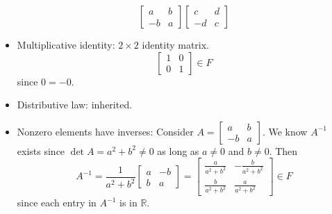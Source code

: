 \documentclass{amsart}
\begin{document}
\begin{itemize}
$$\begin{bmatrix}
		a & b \\
		-b & a
		\end{bmatrix} \begin{bmatrix}
		c & d \\
		-d & c
		\end{bmatrix}  $$
		\item Multiplicative identity: $2\times 2$ identity matrix.
		$$ \begin{bmatrix}
		1 & 0 \\
		0 & 1
		\end{bmatrix} \in F $$ since $0 = -0$.
		\item Distributive law: inherited.
		\item Nonzero elements have inverses:
		Consider $A = \begin{bmatrix}
		a & b \\
		-b & a
		\end{bmatrix}$. We know $A^{-1}$ exists since $\det A = a^2 + b^2 \neq 0$ as long as $a \neq 0$ and $b \neq 0$. Then $$A^{-1} = \frac{1}{a^2 + b^2}\begin{bmatrix}
		a & -b \\
		b & a
		\end{bmatrix} = \begin{bmatrix}
		\frac{a}{a^2 + b^2} & -\frac{b}{a^2 + b^2} \\
		\frac{b}{a^2 + b^2} & \frac{a}{a^2 + b^2} 
		\end{bmatrix} \in F $$ since each entry in $A^{-1}$ is in $\mathbb{R}$.
	\end{itemize}
\end{document}

